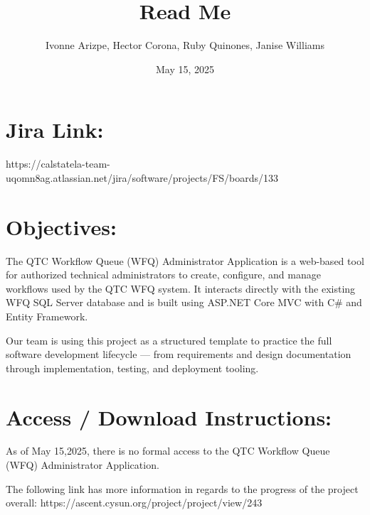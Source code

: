 \documentclass{article}
\begin{document}
\title{Read Me}
\author{Ivonne Arizpe, Hector Corona, Ruby Quinones, Janise Williams}
\date{May 15, 2025}

\fancyhf{}
\fancyfoot[C]{\thepage}

\section{Jira Link: }
https://calstatela-team-uqomn8ag.atlassian.net/jira/software/projects/FS/boards/133

\section{Objectives: }
The QTC Workflow Queue (WFQ) Administrator Application is a web-based tool for authorized technical administrators to create, configure, and manage workflows used by the QTC WFQ system. It interacts directly with the existing WFQ SQL Server database and is built using ASP.NET Core MVC with C\# and Entity Framework.

\vspace{10 pt}

Our team is using this project as a structured template to practice the full software development lifecycle — from requirements and design documentation through implementation, testing, and deployment tooling.

\section{Access / Download Instructions: }
As of May 15,2025, there is no formal access to the QTC Workflow Queue (WFQ) Administrator Application. 

\vspace{10 pt}

The following link has more information in regards to the progress of the project overall:
https://ascent.cysun.org/project/project/view/243
\end{document}
